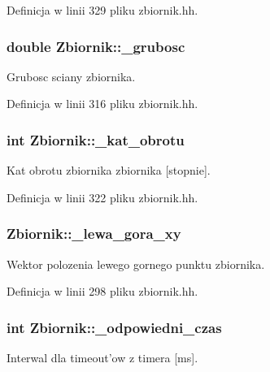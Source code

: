 Definicja w linii 329 pliku zbiornik.\-hh.

\hypertarget{class_zbiornik_a8a1db6d1edbfaa1a4f84d9717a8c0dfc}{
\subsubsection[{\-\_\-grubosc}]{\setlength{\rightskip}{0pt plus 5cm}double Zbiornik\-::\-\_\-grubosc\hspace{0.3cm}{\ttfamily [private]}}}\label{class_zbiornik_a8a1db6d1edbfaa1a4f84d9717a8c0dfc}
Grubosc sciany zbiornika. 

Definicja w linii 316 pliku zbiornik.\-hh.

\hypertarget{class_zbiornik_a0ec6f5babd42c79bf3f1e7055e8d413e}{
\subsubsection[{\-\_\-kat\-\_\-obrotu}]{\setlength{\rightskip}{0pt plus 5cm}int Zbiornik\-::\-\_\-kat\-\_\-obrotu\hspace{0.3cm}{\ttfamily [private]}}}\label{class_zbiornik_a0ec6f5babd42c79bf3f1e7055e8d413e}
Kat obrotu zbiornika zbiornika \mbox{[}stopnie\mbox{]}. 

Definicja w linii 322 pliku zbiornik.\-hh.

\hypertarget{class_zbiornik_aab83049b3afbd20e1f158daf16e17e87}{
\subsubsection[{\-\_\-lewa\-\_\-gora\-\_\-xy}]{ Zbiornik\-::\-\_\-lewa\-\_\-gora\-\_\-xy\hspace{0.3cm}{\ttfamily [private]}}}\label{class_zbiornik_aab83049b3afbd20e1f158daf16e17e87}
Wektor polozenia lewego gornego punktu zbiornika. 

Definicja w linii 298 pliku zbiornik.\-hh.

\hypertarget{class_zbiornik_a14cf0ec861fc38fe40081342ef1e00df}{
\subsubsection[{\-\_\-odpowiedni\-\_\-czas}]{\setlength{\rightskip}{0pt plus 5cm}int Zbiornik\-::\-\_\-odpowiedni\-\_\-czas\hspace{0.3cm}{\ttfamily [private]}}}\label{class_zbiornik_a14cf0ec861fc38fe40081342ef1e00df}
Interwal dla timeout'ow z timera \mbox{[}ms\mbox{]}. 

